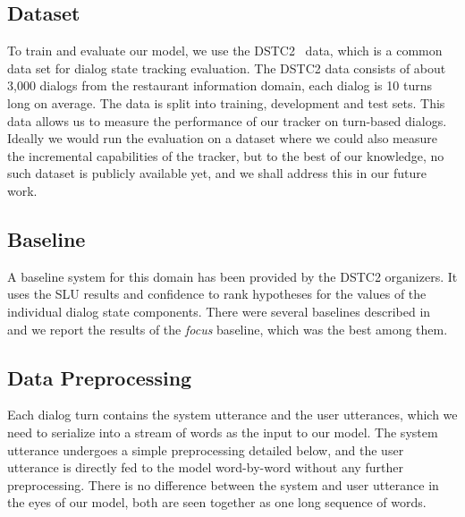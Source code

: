 \documentclass[10pt,twocolumn]{article}
\begin{document}
\subsection{Dataset}
To train and evaluate our model, we use the DSTC2~\cite{henderson2014second} data, which is a common data set for dialog state tracking evaluation. The DSTC2 data consists of about 3,000 dialogs from the restaurant information domain, each dialog is 10 turns long on average. The data is split into training, development and test sets. This data allows us to measure the performance of our tracker on turn-based dialogs. Ideally we would run the evaluation on a dataset where we could also measure the incremental capabilities of the tracker, but to the best of our knowledge, no such dataset is publicly available yet, and we shall address this in our future work.

\subsection{Baseline}
A baseline system for this domain has been provided by the DSTC2 organizers. It uses the SLU results and confidence to rank hypotheses for the values of the individual dialog state components. There were several baselines described in~\cite{henderson2014second} and we report the results of the \emph{focus} baseline, which was the best among them.

\subsection{Data Preprocessing}
Each dialog turn contains the system utterance and the user utterances, which we need to serialize into a stream of words as the input to our model. The system utterance undergoes a simple preprocessing detailed below, and the user utterance is directly fed to the model word-by-word without any further preprocessing. There is no difference between the system and user utterance in the eyes of our model, both are seen together as one long sequence of words.
\end{document}
